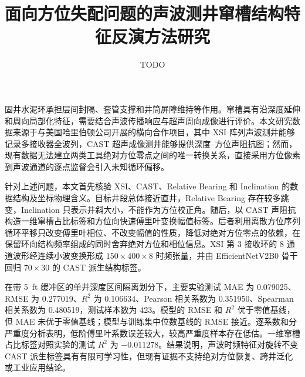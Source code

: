 \documentclass[master]{thesis-uestc}
\title{面向方位失配问题的声波测井窜槽结构特征反演方法研究}{Research on Acoustic Logging Channeling Structure Feature Inversion under Azimuth Mismatch}
\author{TODO}{TODO}
\begin{document}
\makecover

\begin{chineseabstract}
固井水泥环承担层间封隔、套管支撑和井筒屏障维持等作用。窜槽具有沿深度延伸和周向局部化特征，需要结合声波传播响应与超声周向成像进行评价。本文研究数据来源于与美国哈里伯顿公司开展的横向合作项目，其中 XSI 阵列声波测井能够记录多接收器全波列，CAST 超声成像测井能够提供深度--方位声阻抗图；然而，现有数据无法建立两类工具绝对方位零点之间的唯一转换关系，直接采用方位像素到声波通道的逐点监督会引入未知循环偏移。

针对上述问题，本文首先核验 XSI、CAST、Relative Bearing 和 Inclination 的数据结构及坐标物理含义。目标井段总体接近直井，Relative Bearing 存在较多跳变，Inclination 只表示井斜大小，不能作为方位校正角。随后，以 CAST 声阻抗构造一维窜槽占比标签和方位向快速傅里叶变换幅值标签。后者利用离散方位序列循环平移只改变傅里叶相位、不改变幅值的性质，降低对绝对方位零点的依赖，在保留环向结构频率组成的同时舍弃绝对方位和相位信息。XSI 第 3 接收环的 8 通道波形经连续小波变换形成 $150\times400\times8$ 时频张量，并由 EfficientNetV2B0 骨干回归 $70\times30$ 的 CAST 派生结构标签。

在带 5~ft 缓冲区的单井深度区间隔离划分下，主要实验测试 MAE 为 0.079025、RMSE 为 0.277019、$R^2$ 为 0.106634、Pearson 相关系数为 0.351950、Spearman 相关系数为 0.480519，测试样本数为 423。模型的 RMSE 和 $R^2$ 优于零值基线，但 MAE 未优于零值基线；模型与训练集中位数基线的 RMSE 接近。逐系数和分严重度分析表明，低阶傅里叶系数误差较大，较高严重度样本存在低估。一维窜槽占比标签对照实验的测试 $R^2$ 为 $-0.011278$。结果说明，声波时频特征对旋转不变 CAST 派生标签具有有限可学习性，但现有证据不支持绝对方位恢复、跨井泛化或工业应用结论。

\end{chineseabstract}
\end{document}

